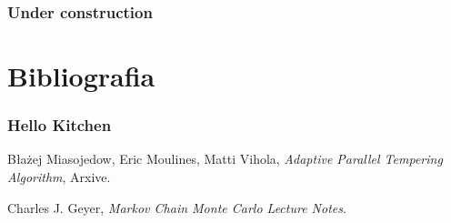 \documentclass[xetex]{beamer}
\begin{document}
\begin{frame}
	\frametitle{Under construction}
\end{frame}


\section[Bibliografia]{Bibliografia}

\begin{frame}

	\frametitle{Hello Kitchen}
	
	
	\begin{thebibliography}{10}

		\beamertemplatebookbibitems
		
	  			Błażej Miasojedow, Eric Moulines, Matti Vihola,
	 			\emph{Adaptive Parallel Tempering Algorithm},
	  			Arxive.

		\beamertemplatearticlebibitems
		
				Charles J. Geyer,
				\emph{Markov Chain Monte Carlo Lecture Notes}.  

	\end{thebibliography}

\end{frame}
\end{document}
